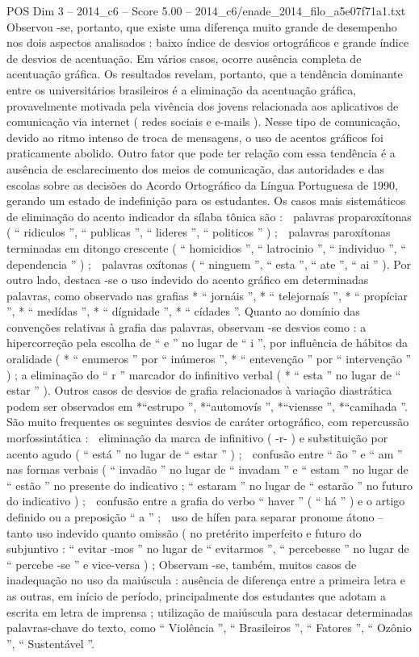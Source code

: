 \begin{textsample}{POS Dim 3 – 2014\_c6 – Score 5.00 – 2014\_c6/enade\_2014\_filo\_a5e07f71a1.txt}
Observou -se, portanto, que existe uma diferença muito grande de desempenho nos dois aspectos analisados : baixo índice de desvios ortográficos e grande índice de desvios de acentuação.
Em vários casos, ocorre ausência completa de acentuação gráfica.
Os resultados revelam, portanto, que a tendência dominante entre os universitários brasileiros é a eliminação da acentuação gráfica, provavelmente motivada pela vivência dos jovens relacionada aos aplicativos de comunicação via internet ( redes sociais e e-mails ).
Nesse tipo de comunicação, devido ao ritmo intenso de troca de mensagens, o uso de acentos gráficos foi praticamente abolido.
Outro fator que pode ter relação com essa tendência é a ausência de esclarecimento dos meios de comunicação, das autoridades e das escolas sobre as decisões do Acordo Ortográfico da Língua Portuguesa de 1990, gerando um estado de indefinição para os estudantes.
Os casos mais sistemáticos de eliminação do acento indicador da sílaba tônica são :  palavras proparoxítonas ( “ ridiculos ”, “ publicas ”, “ lideres ”, “ politicos ” ) ;  palavras paroxítonas terminadas em ditongo crescente ( “ homicidios ”, “ latrocinio ”, “ individuo ”, “ dependencia ” ) ;  palavras oxítonas ( “ ninguem ”, “ esta ”, “ ate ”, “ ai ” ).
Por outro lado, destaca -se o uso indevido do acento gráfico em determinadas palavras, como observado nas grafias * “ jornáis ”, * “ telejornaís ”, * “ propíciar ”, * “ medídas ”, * “ dígnidade ”, * “ cídades ”.
Quanto ao domínio das convenções relativas à grafia das palavras, observam -se desvios como : a hipercorreção pela escolha de “ e ” no lugar de “ i ”, por influência de hábitos da oralidade ( * “ enumeros ” por “ inúmeros ”, * “ entevenção ” por “ intervenção ” ) ; a eliminação do “ r ” marcador do infinitivo verbal ( * “ esta ” no lugar de “ estar ” ).
Outros casos de desvios de grafia relacionados à variação diastrática podem ser observados em *“estrupo ”, *“automovís ”, *“viensse ”, *“camihada ”.
São muito frequentes os seguintes desvios de caráter ortográfico, com repercussão morfossintática :  eliminação da marca de infinitivo ( -r- ) e substituição por acento agudo ( “ está ” no lugar de “ estar ” ) ;  confusão entre “ ão ” e “ am ” nas formas verbais ( “ invadão ” no lugar de “ invadam ” e “ estam ” no lugar de “ estão ” no presente do indicativo ; “ estaram ” no lugar de “ estarão ” no futuro do indicativo ) ;  confusão entre a grafia do verbo “ haver ” ( “ há ” ) e o artigo definido ou a preposição “ a ” ;  uso de hífen para separar pronome átono – tanto uso indevido quanto omissão ( no pretérito imperfeito e futuro do subjuntivo : “ evitar -mos ” no lugar de “ evitarmos ”, “ percebesse ” no lugar de “ percebe -se ” e vice-versa ) ; Observam -se, também, muitos casos de inadequação no uso da maiúscula : ausência de diferença entre a primeira letra e as outras, em início de período, principalmente dos estudantes que adotam a escrita em letra de imprensa ; utilização de maiúscula para destacar determinadas palavras-chave do texto, como “ Violência ”, “ Brasileiros ”, “ Fatores ”, “ Ozônio ”, “ Sustentável ”.

\end{textsample}
